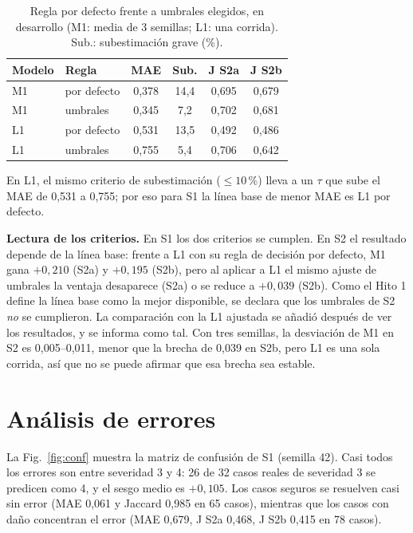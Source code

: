 \documentclass[conference]{IEEEtran}
\begin{document}
\begin{table}[t]
\centering
\caption{Regla por defecto frente a umbrales elegidos, en desarrollo (M1: media de 3 semillas; L1: una corrida). Sub.: subestimación grave (\%).}
\label{tab:umb}
\footnotesize
\setlength{\tabcolsep}{3pt}
\begin{tabular}{@{}llcccc@{}}
\toprule
Modelo & Regla & MAE & Sub. & J S2a & J S2b \\
\midrule
M1 & por defecto & 0,378 & 14,4 & 0,695 & 0,679 \\
M1 & umbrales & 0,345 & 7,2 & 0,702 & 0,681 \\
L1 & por defecto & 0,531 & 13,5 & 0,492 & 0,486 \\
L1 & umbrales & 0,755 & 5,4 & 0,706 & 0,642 \\
\bottomrule
\end{tabular}
\end{table}

En L1, el mismo criterio de subestimación ($\le10$\,\%) lleva a un $\tau$ que sube el MAE de 0,531 a 0,755; por eso para S1 la línea base de menor MAE es L1 por defecto.

\textbf{Lectura de los criterios.} En S1 los dos criterios se cumplen. En S2 el resultado depende de la línea base: frente a L1 con su regla de decisión por defecto, M1 gana $+0{,}210$ (S2a) y $+0{,}195$ (S2b), pero al aplicar a L1 el mismo ajuste de umbrales la ventaja desaparece (S2a) o se reduce a $+0{,}039$ (S2b). Como el Hito 1 define la línea base como la mejor disponible, se declara que los umbrales de S2 \emph{no} se cumplieron. La comparación con la L1 ajustada se añadió después de ver los resultados, y se informa como tal. Con tres semillas, la desviación de M1 en S2 es 0,005--0,011, menor que la brecha de 0,039 en S2b, pero L1 es una sola corrida, así que no se puede afirmar que esa brecha sea estable.

\section{Análisis de errores}
La Fig.~\ref{fig:conf} muestra la matriz de confusión de S1 (semilla 42). Casi todos los errores son entre severidad 3 y 4: 26 de 32 casos reales de severidad 3 se predicen como 4, y el sesgo medio es $+0{,}105$. Los casos seguros se resuelven casi sin error (MAE 0,061 y Jaccard 0,985 en 65 casos), mientras que los casos con daño concentran el error (MAE 0,679, J S2a 0,468, J S2b 0,415 en 78 casos).
\end{document}
